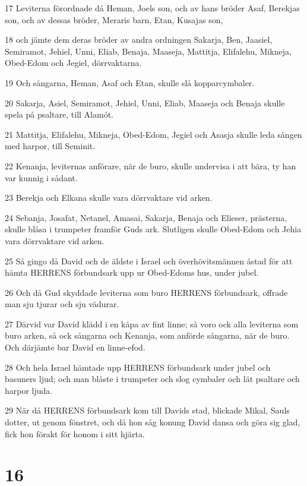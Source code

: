 \par 17 Leviterna förordnade då Heman, Joels son, och av hans bröder Asaf, Berekjas son, och av dessas bröder, Meraris barn, Etan, Kusajas son,
\par 18 och jämte dem deras bröder av andra ordningen Sakarja, Ben, Jaasiel, Semiramot, Jehiel, Unni, Eliab, Benaja, Maaseja, Mattitja, Elifalehu, Mikneja, Obed-Edom och Jegiel, dörrvaktarna.
\par 19 Och sångarna, Heman, Asaf och Etan, skulle slå kopparcymbaler.
\par 20 Sakarja, Asiel, Semiramot, Jehiel, Unni, Eliab, Maaseja och Benaja skulle spela på psaltare, till Alamót.
\par 21 Mattitja, Elifalehu, Mikneja, Obed-Edom, Jegiel och Asasja skulle leda sången med harpor, till Seminit.
\par 22 Kenanja, leviternas anförare, när de buro, skulle undervisa i att bära, ty han var kunnig i sådant.
\par 23 Berekja och Elkana skulle vara dörrvaktare vid arken.
\par 24 Sebanja, Josafat, Netanel, Amasai, Sakarja, Benaja och Elieser, prästerna, skulle blåsa i trumpeter framför Guds ark. Slutligen skulle Obed-Edom och Jehia vara dörrvaktare vid arken.
\par 25 Så gingo då David och de äldste i Israel och överhövitsmännen åstad för att hämta HERRENS förbundsark upp ur Obed-Edoms hus, under jubel.
\par 26 Och då Gud skyddade leviterna som buro HERRENS förbundsark, offrade man sju tjurar och sju vädurar.
\par 27 Därvid var David klädd i en kåpa av fint linne; så voro ock alla leviterna som buro arken, så ock sångarna och Kenanja, som anförde sångarna, när de buro. Och därjämte bar David en linne-efod.
\par 28 Och hela Israel hämtade upp HERRENS förbundsark under jubel och basuners ljud; och man blåste i trumpeter och slog cymbaler och lät psaltare och harpor ljuda.
\par 29 När då HERRENS förbundsark kom till Davids stad, blickade Mikal, Sauls dotter, ut genom fönstret, och då hon såg konung David dansa och göra sig glad, fick hon förakt för honom i sitt hjärta.

\chapter{16}

